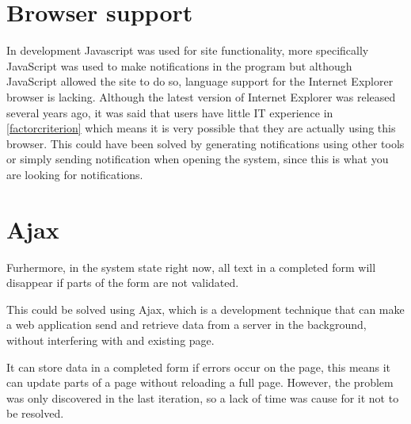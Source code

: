 \section{Browser support}
In development Javascript was used for site functionality, more specifically JavaScript was used to make notifications in the program but although JavaScript allowed the site to do so, language support for the Internet Explorer browser is lacking.
Although the latest version of Internet Explorer was released several years ago, it was said that users have little IT experience in \cref{factorcriterion} which means it is very possible that they are actually using this browser.
This could have been solved by generating notifications using other tools or simply sending notification when opening the system, since this is what you are looking for notifications.

\section{Ajax}

Furhermore, in the system state right now, all text in a completed form will disappear if parts of the form are not validated.

This could be solved using Ajax, which is a development technique that can make a web application send and retrieve data from a server in the background, without interfering with and existing page.

It can store data in a completed form if errors occur on the page, this means it can update parts of a page without reloading a full page.
However, the problem was only discovered in the last iteration, so a lack of time was cause for it not to be resolved.

